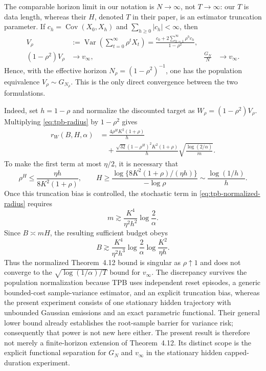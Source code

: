 The comparable horizon limit in our notation is \(N\to\infty\), not
\(T\to\infty\): our \(T\) is data length, whereas their \(H\), denoted \(T\)
in their paper, is an estimator truncation parameter.  If
\(c_h=\operatorname{Cov}(X_0,X_h)\) and
\(\sum_{h\geq0}|c_h|<\infty\), then
\begin{align}
 V_\rho
 &:={\operatorname{Var}}\left(\sum_{t=0}^\infty\rho^tX_t\right)
 =\frac{c_0+2\sum_{h=1}^\infty\rho^hc_h}{1-\rho^2},
 \label{eq:tpb-abelian-exact}\\
 (1-\rho^2)V_\rho&\longrightarrow v_\infty,
 &
 \frac{G_N}{N}&\longrightarrow v_\infty.
 \label{eq:tpb-abelian-limit}
\end{align}
Hence, with the effective horizon
\(N_\rho=(1-\rho^2)^{-1}\), one has the population equivalence
\(V_\rho\sim G_{N_\rho}\).  This is the only direct convergence between
the two formulations.

Indeed, set \(h=1-\rho\) and normalize the discounted target as
\(W_\rho=(1-\rho^2)V_\rho\).  Multiplying
\eqref{eq:tpb-radius} by \(1-\rho^2\) gives
\begin{align}
 r_{W}(B,H,\alpha)
 &=\frac{4\rho^HK^2(1+\rho)}h
 \nonumber\\
 &\quad+
 \frac{\sqrt{32}(1-\rho^H)^2K^2(1+\rho)}h
 \sqrt{\frac{\log(2/\alpha)}m}.
 \label{eq:tpb-normalized-radius}
\end{align}
To make the first term at most \(\eta/2\), it is necessary that
\begin{equation}
 \rho^H\leq\frac{\eta h}{8K^2(1+\rho)},\qquad
 H\geq
 \frac{\log\{8K^2(1+\rho)/(\eta h)\}}{-\log\rho}
 \sim\frac{\log(1/h)}h.
 \label{eq:tpb-truncation-need}
\end{equation}
Once this truncation bias is controlled, the stochastic term in
\eqref{eq:tpb-normalized-radius} requires
\[
 m\gtrsim
 \frac{K^4}{\eta^2h^2}\log\frac2\alpha.
\]
Since \(B\asymp mH\), the resulting sufficient budget obeys
\begin{equation}
 B\gtrsim
 \frac{K^4}{\eta^2h^3}
 \log\frac2\alpha
 \log\frac{K^2}{\eta h}.
 \label{eq:tpb-singular-budget}
\end{equation}
Thus the normalized Theorem~4.12 bound is singular as
\(\rho\uparrow1\) and does not converge to the
\(\sqrt{\log(1/\alpha)/T}\) bound for \(v_\infty\).  The discrepancy
survives the population normalization because TPB uses independent reset
episodes, a generic bounded-cost sample-variance estimator, and an explicit
truncation bias, whereas the present experiment consists of one stationary
hidden trajectory with unbounded Gaussian emissions and an exact parametric
functional.  Their general lower bound already establishes the root-sample
barrier for variance risk; consequently that power is not new here either.
The present result is therefore not merely a finite-horizon extension of
Theorem~4.12.  Its distinct scope is the explicit functional separation for
\(G_N\) and \(v_\infty\) in the stationary hidden capped-duration experiment.

